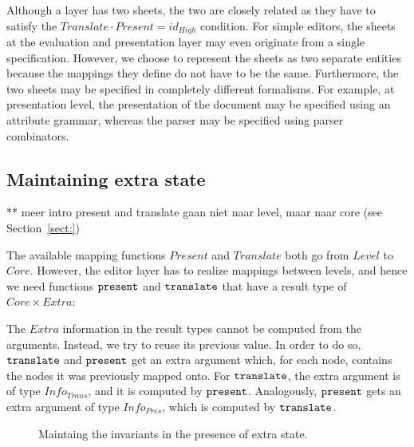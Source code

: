 Although a layer has two sheets, the two are closely related as they have to satisfy the
$Translate \cdot Present = id_{High}$ condition. For simple editors, the sheets at the evaluation and presentation layer may even originate from a single specification. However, we choose to represent the sheets as two separate entities because the mappings they define do not have to be the same.  Furthermore, the two sheets may be specified in completely different formalisms. For example, at presentation level, the presentation of the document may be specified using an attribute grammar, whereas the parser may be specified using parser combinators.


%																
%																
%																
\subsection{Maintaining extra state} \label{sect:maintainingExtraState}

** meer intro
present and translate gaan niet naar level, maar naar core (see Section~\ref{sect:})

The available mapping functions $Present$ and $Translate$ both go from $Level$ to $Core$. However, the editor layer has to realize mappings between levels, and hence we need functions ${\tt present}$ and ${\tt translate}$ that have a result type of $Core \times Extra$:


The $Extra$ information in the result types cannot be computed from the arguments. Instead, we try to reuse its previous value. In order to do so, ${\tt translate}$ and ${\tt present}$ get an extra argument which, for each node, contains the nodes it was previously mapped onto. For ${\tt translate}$, the extra argument is of type $Info_{Trans}$, and it is computed by ${\tt present}$. Analogously, ${\tt present}$ gets an extra argument of type $Info_{Pres}$, which is computed by ${\tt translate}$. 


\begin{figure}
\begin{center}
\begin{center}
\end{center}
\caption{Maintaing the invariants in the presence of extra state.}\label{layerExtraState} 
\end{center}
\end{figure}


